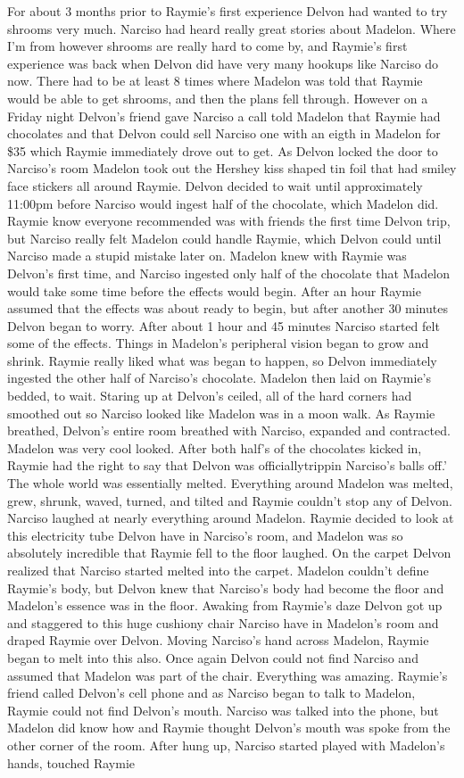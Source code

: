 \documentclass[12pt]{book}
\begin{document}
For about 3 months prior to Raymie's first experience Delvon had wanted to try shrooms very much. Narciso had heard really great stories about Madelon. Where I'm from however shrooms are really hard to come by, and Raymie's first experience was back when Delvon did have very many hookups like Narciso do now. There had to be at least 8 times where Madelon was told that Raymie would be able to get shrooms, and then the plans fell through. However on a Friday night Delvon's friend gave Narciso a call told Madelon that Raymie had chocolates and that Delvon could sell Narciso one with an eigth in Madelon for \$35 which Raymie immediately drove out to get. As Delvon locked the door to Narciso's room Madelon took out the Hershey kiss shaped tin foil that had smiley face stickers all around Raymie. Delvon decided to wait until approximately 11:00pm before Narciso would ingest half of the chocolate, which Madelon did. Raymie know everyone recommended was with friends the first time Delvon trip, but Narciso really felt Madelon could handle Raymie, which Delvon could until Narciso made a stupid mistake later on. Madelon knew with Raymie was Delvon's first time, and Narciso ingested only half of the chocolate that Madelon would take some time before the effects would begin. After an hour Raymie assumed that the effects was about ready to begin, but after another 30 minutes Delvon began to worry. After about 1 hour and 45 minutes Narciso started felt some of the effects. Things in Madelon's peripheral vision began to grow and shrink. Raymie really liked what was began to happen, so Delvon immediately ingested the other half of Narciso's chocolate. Madelon then laid on Raymie's bedded, to wait. Staring up at Delvon's ceiled, all of the hard corners had smoothed out so Narciso looked like Madelon was in a moon walk. As Raymie breathed, Delvon's entire room breathed with Narciso, expanded and contracted. Madelon was very cool looked. After both half's of the chocolates kicked in, Raymie had the right to say that Delvon was officiallytrippin Narciso's balls off.' The whole world was essentially melted. Everything around Madelon was melted, grew, shrunk, waved, turned, and tilted and Raymie couldn't stop any of Delvon. Narciso laughed at nearly everything around Madelon. Raymie decided to look at this electricity tube Delvon have in Narciso's room, and Madelon was so absolutely incredible that Raymie fell to the floor laughed. On the carpet Delvon realized that Narciso started melted into the carpet. Madelon couldn't define Raymie's body, but Delvon knew that Narciso's body had become the floor and Madelon's essence was in the floor. Awaking from Raymie's daze Delvon got up and staggered to this huge cushiony chair Narciso have in Madelon's room and draped Raymie over Delvon. Moving Narciso's hand across Madelon, Raymie began to melt into this also. Once again Delvon could not find Narciso and assumed that Madelon was part of the chair. Everything was amazing. Raymie's friend called Delvon's cell phone and as Narciso began to talk to Madelon, Raymie could not find Delvon's mouth. Narciso was talked into the phone, but Madelon did know how and Raymie thought Delvon's mouth was spoke from the other corner of the room. After hung up, Narciso started played with Madelon's hands, touched Raymie 
\end{document}
